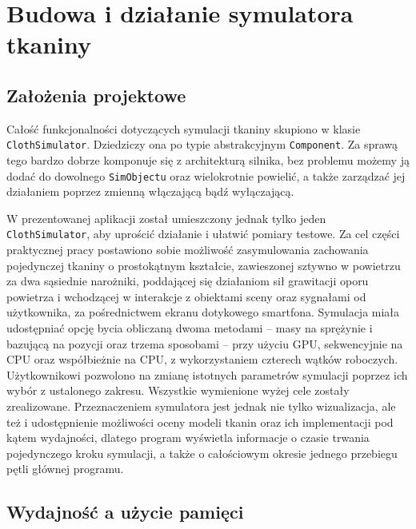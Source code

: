 \chapter{Budowa i działanie symulatora tkaniny}
\label{t:symulacja}

	\section{Założenia projektowe}
	\label{t:symulacja:zalozenia}
	
	
	Całość funkcjonalności dotyczących symulacji tkaniny skupiono w klasie \texttt{ClothSimulator}. Dziedziczy ona po typie abstrakcyjnym \texttt{Component}. Za sprawą tego bardzo dobrze komponuje się z architekturą silnika, bez problemu możemy ją dodać do dowolnego \texttt{SimObjectu} oraz wielokrotnie powielić, a także zarządzać jej działaniem poprzez zmienną włączającą bądź wyłączającą.
	
	W prezentowanej aplikacji został umieszczony jednak tylko jeden \texttt{ClothSimulator}, aby uprościć działanie i ułatwić pomiary testowe. Za cel części praktycznej pracy postawiono sobie możliwość zasymulowania zachowania pojedynczej tkaniny o prostokątnym kształcie, zawieszonej sztywno w powietrzu za dwa sąsiednie narożniki, poddającej się działaniom sił grawitacji oporu powietrza i wchodzącej w interakcje z obiektami sceny oraz sygnałami od użytkownika, za pośrednictwem ekranu dotykowego smartfona. Symulacja miała udostępniać opcję bycia obliczaną dwoma metodami -- masy na sprężynie i bazującą na pozycji oraz trzema sposobami -- przy użyciu GPU, sekwencyjnie na CPU oraz współbieżnie na CPU, z wykorzystaniem czterech wątków roboczych. Użytkownikowi pozwolono na zmianę istotnych parametrów symulacji poprzez ich wybór z ustalonego zakresu. Wszystkie wymienione wyżej cele zostały zrealizowane. Przeznaczeniem symulatora jest jednak nie tylko wizualizacja, ale też i udostępnienie możliwości oceny modeli tkanin oraz ich implementacji pod kątem wydajności, dlatego program wyświetla informacje o czasie trwania pojedynczego kroku symulacji, a także o całościowym okresie jednego przebiegu pętli głównej programu. 
	
	\section{Wydajność a użycie pamięci}
	\label{t:symulacja:wydajnoscpamiec}
	
